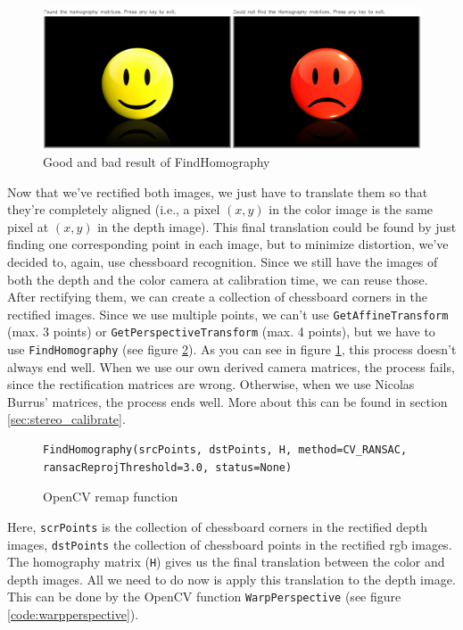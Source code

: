 \begin{figure}[H]
\centering
\includegraphics[scale=0.6]{images/homography.png}
\caption{Good and bad result of FindHomography}
\label{fig:homography}
\end{figure}

Now that we've rectified both images, we just have to translate them so that they're completely aligned (i.e., a pixel $\left(x, y\right)$ in the color image is the same pixel at $\left(x, y\right)$ in the depth image). This final translation could be found by just finding one corresponding point in each image, but to minimize distortion, we've decided to, again, use chessboard recognition. Since we still have the images of both the depth and the color camera at calibration time, we can reuse those. After rectifying them, we can create a collection of chessboard corners in the rectified images. Since we use multiple points, we can't use \verb|GetAffineTransform| (max. 3 points) or \verb|GetPerspectiveTransform| (max. 4 points), but we have to use \verb|FindHomography| (see figure \ref{code:findhomography}). As you can see in figure \ref{fig:homography}, this process doesn't always end well. When we use our own derived camera matrices, the process fails, since the rectification matrices are wrong. Otherwise, when we use Nicolas Burrus' matrices, the process ends well. More about this can be found in section \ref{sec:stereo_calibrate}.

\begin{figure}[H]
\begin{lstlisting}
FindHomography(srcPoints, dstPoints, H, method=CV_RANSAC, ransacReprojThreshold=3.0, status=None)
\end{lstlisting}
\caption{OpenCV remap function}
\label{code:findhomography}
\end{figure}

Here, \verb|scrPoints| is the collection of chessboard corners in the rectified depth images, \verb|dstPoints| the collection of chessboard points in the rectified rgb images. The homography matrix (\verb|H|) gives us the final translation between the color and depth images. All we need to do now is apply this translation to the depth image. This can be done by the OpenCV function \verb|WarpPerspective| (see figure \ref{code:warpperspective}).

